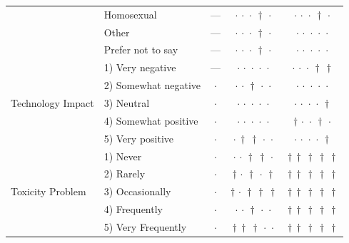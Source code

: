 {\begin{longtable}[t]{llccc}
 & Homosexual & --- & ${\cdot}\,{\cdot}\,{\cdot}\,{\dagger}\,{\cdot}$ & ${\cdot}\,{\cdot}\,{\cdot}\,{\dagger}\,{\cdot}$ \\
 & Other & --- & ${\cdot}\,{\cdot}\,{\cdot}\,{\dagger}\,{\cdot}$ & ${\cdot}\,{\cdot}\,{\cdot}\,{\cdot}\,{\cdot}$ \\
 & Prefer not to say & --- & ${\cdot}\,{\cdot}\,{\cdot}\,{\dagger}\,{\cdot}$ & ${\cdot}\,{\cdot}\,{\cdot}\,{\cdot}\,{\cdot}$ \\
\cline{1-5}
\multirow[t]{5}{*}{Technology Impact} & 1) Very negative & --- & ${\cdot}\,{\cdot}\,{\cdot}\,{\cdot}\,{\cdot}$ & ${\cdot}\,{\cdot}\,{\cdot}\,{\dagger}\,{\dagger}$ \\
 & 2) Somewhat negative & $\cdot$ & ${\cdot}\,{\cdot}\,{\dagger}\,{\cdot}\,{\cdot}$ & ${\cdot}\,{\cdot}\,{\cdot}\,{\cdot}\,{\cdot}$ \\
 & 3) Neutral & $\cdot$ & ${\cdot}\,{\cdot}\,{\cdot}\,{\cdot}\,{\cdot}$ & ${\cdot}\,{\cdot}\,{\cdot}\,{\cdot}\,{\dagger}$ \\
 & 4) Somewhat positive & $\cdot$ & ${\cdot}\,{\cdot}\,{\cdot}\,{\cdot}\,{\cdot}$ & ${\dagger}\,{\cdot}\,{\cdot}\,{\dagger}\,{\cdot}$ \\
 & 5) Very positive & $\cdot$ & ${\cdot}\,{\dagger}\,{\dagger}\,{\cdot}\,{\cdot}$ & ${\cdot}\,{\cdot}\,{\cdot}\,{\cdot}\,{\dagger}$ \\
\cline{1-5}
\multirow[t]{5}{*}{Toxicity Problem} & 1) Never & $\cdot$ & ${\cdot}\,{\cdot}\,{\dagger}\,{\dagger}\,{\cdot}$ & ${\dagger}\,{\dagger}\,{\dagger}\,{\dagger}\,{\dagger}$ \\
 & 2) Rarely & $\cdot$ & ${\dagger}\,{\cdot}\,{\dagger}\,{\cdot}\,{\dagger}$ & ${\dagger}\,{\dagger}\,{\dagger}\,{\dagger}\,{\dagger}$ \\
 & 3) Occasionally & $\cdot$ & ${\dagger}\,{\cdot}\,{\dagger}\,{\dagger}\,{\dagger}$ & ${\dagger}\,{\dagger}\,{\dagger}\,{\dagger}\,{\dagger}$ \\
 & 4) Frequently & $\cdot$ & ${\cdot}\,{\cdot}\,{\dagger}\,{\cdot}\,{\cdot}$ & ${\dagger}\,{\dagger}\,{\dagger}\,{\dagger}\,{\dagger}$ \\
 & 5) Very Frequently & $\cdot$ & ${\dagger}\,{\dagger}\,{\dagger}\,{\cdot}\,{\cdot}$ & ${\dagger}\,{\dagger}\,{\dagger}\,{\dagger}\,{\dagger}$ \\
\cline{1-5}
\end{longtable}
}

